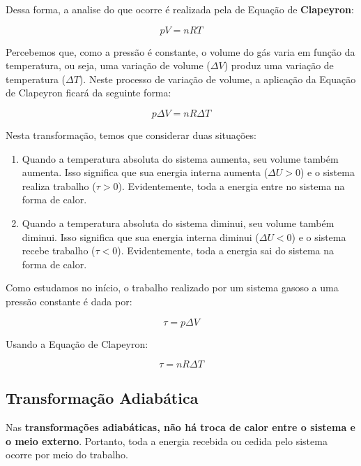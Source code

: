 \documentclass[12pt]{article}
\begin{document}
Dessa forma, a analise do que ocorre é realizada pela de Equação de \textbf{Clapeyron}:


\begin{equation}
    pV=nRT
\end{equation}


Percebemos que, como a pressão é constante, o volume do gás varia em função da temperatura, ou seja, uma variação de volume ($\Delta V$) produz uma variação de temperatura ($\Delta T$). Neste processo de variação de volume, a aplicação da Equação de Clapeyron ficará da seguinte forma:


\begin{equation*}
    p\Delta V=nR\Delta T
\end{equation*}


Nesta transformação, temos que considerar duas situações:


\begin{enumerate}

\item{Quando a temperatura absoluta do sistema aumenta, seu volume também aumenta. Isso significa que sua energia interna aumenta ($\Delta U>0$) e o sistema realiza trabalho ($\tau>0$). Evidentemente, toda a energia entre no sistema na forma de calor.}

\item{Quando a temperatura absoluta do sistema diminui, seu volume também diminui. Isso significa que sua energia interna diminui ($\Delta U<0$) e o sistema recebe trabalho ($\tau<0$). Evidentemente, toda a energia sai do sistema na forma de calor.}

\end{enumerate}


Como estudamos no início, o trabalho realizado por um sistema gasoso a uma pressão constante é dada por:


\begin{equation*}
    \tau = p\Delta V
\end{equation*}


Usando a Equação de Clapeyron:


\begin{equation*}
    \tau = nR\Delta T
\end{equation*}


\hypertarget{x-transformação-adiabática}{\subsection{Transformação Adiabática}}
Nas \textbf{transformações adiabáticas, não há troca de calor entre o sistema e o meio externo}. Portanto, toda a energia recebida ou cedida pelo sistema ocorre por meio do trabalho.
\end{document}
